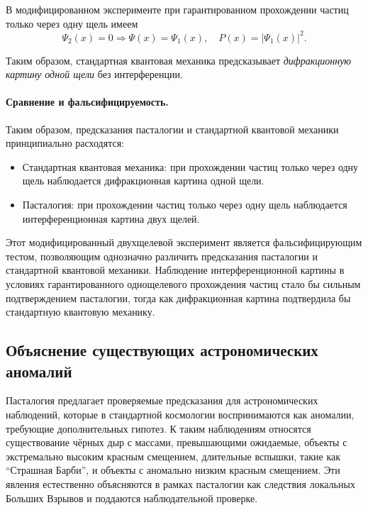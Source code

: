\documentclass[pdflatex,sn-mathphys-num,referee]{sn-jnl}
\begin{document}
В модифицированном эксперименте при гарантированном прохождении частиц только через одну щель имеем
\begin{equation}
    \Psi_2(x) = 0 \Rightarrow \Psi(x) = \Psi_1(x), \quad P(x) = |\Psi_1(x)|^2.
\end{equation}

Таким образом, стандартная квантовая механика предсказывает \emph{дифракционную картину одной щели} без интерференции.

\paragraph{Сравнение и фальсифицируемость.} Таким образом, предсказания пасталогии и стандартной квантовой механики принципиально расходятся:
\begin{itemize}
    \item Стандартная квантовая механика: при прохождении частиц только через одну щель наблюдается дифракционная картина одной щели.
    \item Пасталогия: при прохождении частиц только через одну щель наблюдается интерференционная картина двух щелей.
\end{itemize}
Этот модифицированный двухщелевой эксперимент является фальсифицирующим тестом, позволяющим однозначно различить предсказания пасталогии и стандартной квантовой механики. Наблюдение интерференционной картины в условиях гарантированного однощелевого прохождения частиц стало бы сильным подтверждением пасталогии, тогда как дифракционная картина подтвердила бы стандартную квантовую механику.

\subsection{Объяснение существующих астрономических аномалий}\label{subsec:astronomical-anomalies}

Пасталогия предлагает проверяемые предсказания для астрономических наблюдений, которые в стандартной космологии воспринимаются как аномалии, требующие дополнительных гипотез. К таким наблюдениям относятся существование чёрных дыр с массами, превышающими ожидаемые, объекты с экстремально высоким красным смещением, длительные вспышки, такие как ``Страшная Барби'', и объекты с аномально низким красным смещением. Эти явления естественно объясняются в рамках пасталогии как следствия локальных Больших Взрывов и поддаются наблюдательной проверке.
\end{document}
